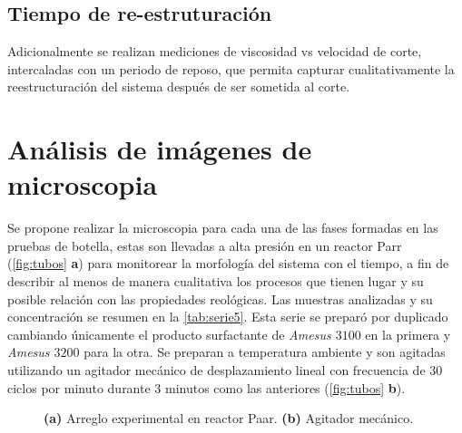 \subsection*{Tiempo de re-estruturación}
Adicionalmente se realizan mediciones de viscosidad vs velocidad de corte, intercaladas con un periodo de reposo, que permita capturar cualitativamente la reestructuración del sistema después de ser sometida al corte.

\section{Análisis de imágenes de microscopia}
Se propone realizar la microscopia para cada una de las fases formadas en las pruebas de botella, estas son llevadas a alta presión en un reactor Parr (\autoref{fig:tubos} \textbf{a}) para monitorear la morfología del sistema con el tiempo, a fin de describir al menos de manera cualitativa los procesos que tienen lugar y su posible relación con las propiedades reológicas. Las muestras analizadas y su concentración se resumen en la \autoref{tab:serie5}. Esta serie se preparó por duplicado cambiando únicamente el producto surfactante de \emph{Amesus $3100$} en la primera y \emph{Amesus $3200$} para la otra. Se preparan a temperatura ambiente y son agitadas utilizando un agitador mecánico de desplazamiento lineal con frecuencia de 30 ciclos por minuto durante $3$ minutos como las anteriores (\autoref{fig:tubos} \textbf{b}).

\begin{figure}
    \centering 
    \caption[Muestras en tubos]{\textbf{(a)} Arreglo experimental en reactor Paar. \textbf{(b)} Agitador mecánico. }
    \label{fig:tubos}
\end{figure}

